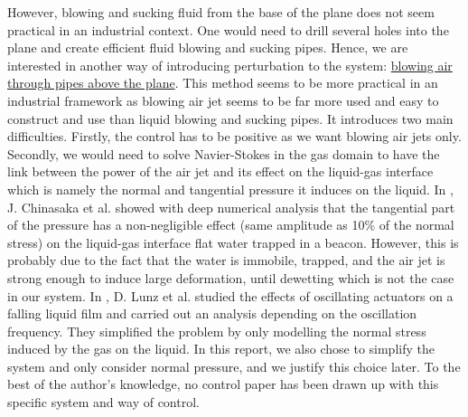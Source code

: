 \documentclass[12pt]{article}
\begin{document}
However, blowing and sucking fluid from the base of the plane does not seem practical in an industrial context. One would need to drill several holes into the plane and create efficient fluid blowing and sucking pipes. Hence, we are interested in another way of introducing perturbation to the system: \underline{blowing air through pipes above the plane}. This method seems to be more practical in an industrial framework as blowing air jet seems to be far more used and easy to construct and use than liquid blowing and sucking pipes. It introduces two main difficulties. Firstly, the control has to be positive as we want blowing air jets only. Secondly, we would need to solve Navier-Stokes in the gas domain to have the link between the power of the air jet and its effect on the liquid-gas interface which is namely the normal and tangential pressure it induces on the liquid. In \cite{Dewetting_Ojiako}, J. Chinasaka et al. showed with deep numerical analysis that the tangential part of the pressure has a non-negligible effect (same amplitude as 10\% of the normal stress) on the liquid-gas interface flat water trapped in a beacon. However, this is probably due to the fact that the water is immobile, trapped, and the air jet is strong enough to induce large deformation, until dewetting which is not the case in our system.  
In \cite{Moving_pressure_source}, D. Lunz et al. studied the effects of oscillating actuators on a falling liquid film and carried out an analysis depending on the oscillation frequency. They simplified the problem by only modelling the normal stress induced by the gas on the liquid.  In this report, we also chose to simplify the system and only consider normal pressure, and we justify this choice later. To the best of the author's knowledge, no control paper has been drawn up with this specific system and way of control. 
\\
\end{document}
